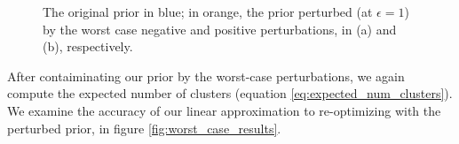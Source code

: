 \documentclass[a4paper]{article}
\begin{document}
\begin{figure}[h!]
\begin{subfigure}[t]{0.4\textwidth}
  \subcaption{}
\end{subfigure}
  \caption{The original prior in blue; in orange, the prior perturbed (at $\epsilon = 1$) by
  the worst case negative and positive perturbations, in (a) and (b), respectively. }
	\label{fig:worst_case_perturbations}
\end{figure}

After contaiminating our prior by the worst-case perturbations, we again compute the
expected number of clusters (equation \ref{eq:expected_num_clusters}). We examine the
accuracy of our linear approximation to re-optimizing with the perturbed prior,
in figure \ref{fig:worst_case_results}.
\end{document}

